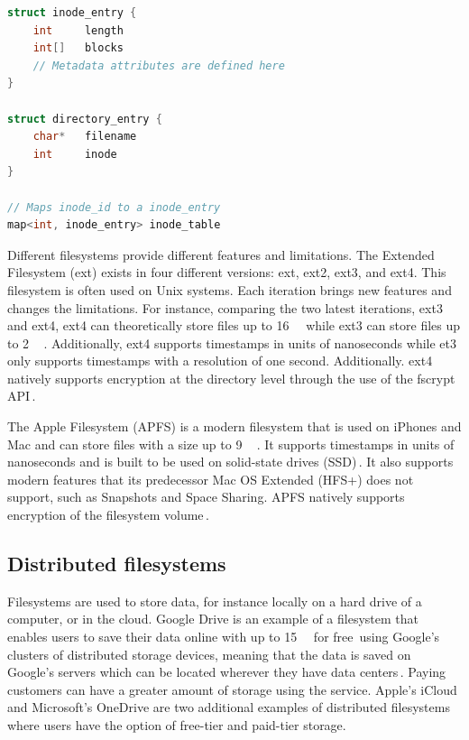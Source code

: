 \begin{minipage}{\linewidth}
\begin{lstlisting}[language=c, caption={Pseudocode of a minimalistic inode filesystem structure}, label=lst:inode_fs]
struct inode_entry {
	int 	length
	int[]	blocks
	// Metadata attributes are defined here
}

struct directory_entry {
	char*   filename
	int     inode
}

// Maps inode_id to a inode_entry
map<int, inode_entry> inode_table

\end{lstlisting}
\end{minipage}

Different filesystems provide different features and limitations. The Extended Filesystem (ext) exists in four different versions: ext, ext2, ext3, and ext4. This filesystem is often used on Unix systems. Each iteration brings new features and changes the limitations. For instance, comparing the two latest iterations, ext3 and ext4, ext4 can theoretically store files up to \SI{16}{\tebi\byte} while ext3 can store files up to \SI{2}{\tebi\byte}\,\cite{salterUnderstandingLinuxFilesystems2018}. Additionally, ext4 supports timestamps in units of nanoseconds while et3 only supports timestamps with a resolution of one second. Additionally. ext4 natively supports encryption at the directory level through the use of the fscrypt API\,\cite{FscryptArchWiki}.

The Apple Filesystem (\gls{APFS}) is a modern filesystem that is used on iPhones and Mac and can store files with a size up to \SI{9}{\exa\byte}\,\cite{igotofferAPFSAppleFile2017}. It supports timestamps in units of nanoseconds and is built to be used on solid-state drives (\gls{SSD})\,\cite{nelsonWhatAPFSDoes}. It also supports modern features that its predecessor Mac OS Extended (HFS+) does not support, such as Snapshots and Space Sharing. APFS natively supports encryption of the filesystem volume\,\cite{appleinc.FileSystemFormats}.

\subsection{Distributed filesystems}
Filesystems are used to store data, for instance locally on a hard drive of a computer, or in the cloud. Google Drive is an example of a filesystem that enables users to save their data online with up to \SI{15}{\giga\byte} for free\,\cite{CloudStorageWork} using Google's clusters of distributed storage devices, meaning that the data is saved on Google's servers which can be located wherever they have data centers\,\cite{DistributedStorageWhat}. Paying customers can have a greater amount of storage using the service. Apple's iCloud and Microsoft's OneDrive are two additional examples of distributed filesystems where users have the option of free-tier and paid-tier storage.

